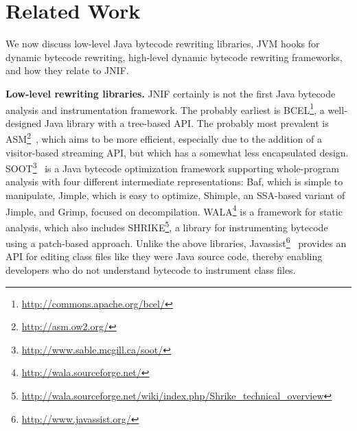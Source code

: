 \section{Related Work}
\label{sec:jnif-relatedwork}

We now discuss low-level Java bytecode rewriting libraries,
JVM hooks for dynamic bytecode rewriting,
high-level dynamic bytecode rewriting frameworks,
and how they relate to JNIF.
 
\textbf{Low-level rewriting libraries.}
JNIF certainly is not the first Java bytecode analysis and instrumentation framework.
The probably earliest is BCEL\footnote{\url{http://commons.apache.org/bcel/}},
a well-designed Java library with a tree-based API.
The probably most prevalent is ASM\footnote{\url{http://asm.ow2.org/}}~\citep{brunetonASMCodeManipulation2002,kuleshovUsingASMFramework2007},
which aims to be more efficient, especially due to the addition of a visitor-based streaming API, 
but which has a somewhat less encapsulated design.
SOOT\footnote{\url{http://www.sable.mcgill.ca/soot/}}~\citep{vallee-raiSootJavaBytecode1999}
is a Java bytecode optimization framework supporting whole-program analysis
with four different intermediate representations:
Baf, which is simple to manipulate,
Jimple, which is easy to optimize, 
Shimple, an SSA-based variant of Jimple, and
Grimp, focused on decompilation. 
%
WALA\footnote{\url{http://wala.sourceforge.net/}} is a framework for static analysis, 
which also includes SHRIKE\footnote{\url{http://wala.sourceforge.net/wiki/index.php/Shrike_technical_overview}}, 
a library for instrumenting bytecode using a patch-based approach.
%
Unlike the above libraries, 
Javassist\footnote{\url{http://www.javassist.org/}}~\cite{chibaEasytoUseToolkitEfficient2003}
provides an API for editing class files like they were Java source code,
thereby enabling developers who do not understand bytecode to instrument class files.

